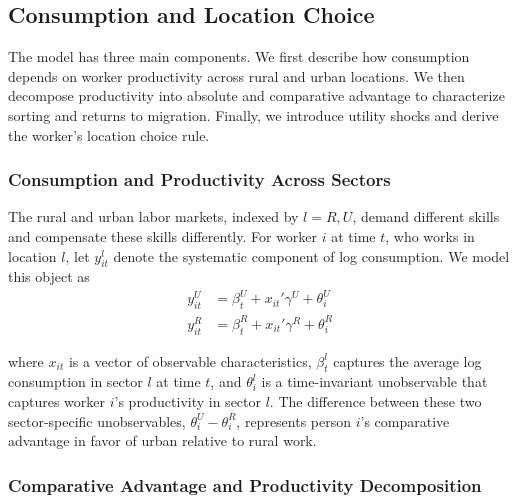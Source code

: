 \subsection{Consumption and Location Choice}\label{location-choice-model}

The model has three main components.
We first describe how consumption depends on worker productivity across rural and urban locations.
We then decompose productivity into absolute and comparative advantage to characterize sorting and returns to migration.
Finally, we introduce utility shocks and derive the worker’s location choice rule.


\subsubsection{Consumption and Productivity Across Sectors}

The rural and urban labor markets, indexed by $l=R,U$, demand different skills and compensate these skills differently. 
For worker $i$ at time $t$, who works in location $l$, let $y_{it}^l$ denote the systematic component of log consumption.
We model this object as
\begin{align}
    y_{it}^{U}&=\beta_t^U+x_{it}'\gamma^U+\theta_i^U \label{eq:y_it_U}\\
    y_{it}^{R}&=\beta_t^R+x_{it}'\gamma^R+\theta_i^R \label{eq:y_it_R}
\end{align}

\noindent where $x_{i t}$ is a vector of observable characteristics, $\beta^{l}_{t}$ captures the average log consumption in sector $l$ at time $t$, and $\theta^{l}_{i}$ is a time-invariant unobservable that captures worker $i$'s productivity in sector $l$.
The difference between these two sector-specific unobservables, $\theta_{i}^U-\theta_{i}^R$, represents person $i$'s comparative advantage in favor of urban relative to rural work.

\subsubsection{Comparative Advantage and Productivity Decomposition}

